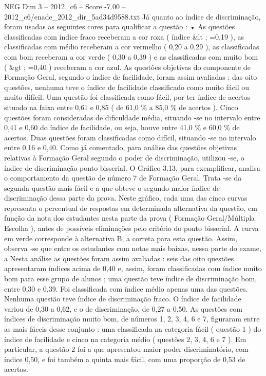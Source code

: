 \begin{textsample}{NEG Dim 3 – 2012\_c6 – Score -7.00 – 2012\_c6/enade\_2012\_dir\_5ad34d9588.txt}
Já quanto ao índice de discriminação, foram usadas as seguintes cores para qualificar a questão : • As questões classificadas com índice fraco receberam a cor roxa ( índice \&lt ; =0,19 ), as classificadas com médio receberam a cor vermelho ( 0,20 a 0,29 ), as classificadas com bom receberam a cor verde ( 0,30 a 0,39 ) e as classificadas com muito bom ( \&gt ; =0,40 ) receberam a cor azul.
As questões objetivas do componente de Formação Geral, segundo o índice de facilidade, foram assim avaliadas : das oito questões, nenhuma teve o índice de facilidade classificado como muito fácil ou muito difícil.
Uma questão foi classificada como fácil, por ter índice de acertos situado na faixa entre 0,61 e 0,85 ( de 61,0 \% a 85,0 \% de acertos ).
Cinco questões foram consideradas de dificuldade média, situando -se no intervalo entre 0,41 e 0,60 do índice de facilidade, ou seja, houve entre 41,0 \% e 60,0 \% de acertos.
Duas questões foram classificadas como difícil, situando -se no intervalo entre 0,16 e 0,40.
Como já comentado, para análise das questões objetivas relativas à Formação Geral segundo o poder de discriminação, utilizou -se, o índice de discriminação ponto bisserial.
O Gráfico 3.13, para exemplificar, analisa o comportamento da questão de número 7 de Formação Geral.
Trata -se da segunda questão mais fácil e a que obteve o segundo maior índice de discriminação dessa parte da prova.
Neste gráfico, cada uma das cinco curvas representa o percentual de respostas em determinada alternativa da questão, em função da nota dos estudantes nesta parte da prova ( Formação Geral/Múltipla Escolha ), antes de possíveis eliminações pelo critério do ponto bisserial.
A curva em verde corresponde à alternativa B, a correta para esta questão.
Assim, observa -se que entre os estudantes com notas mais baixas, nessa parte do exame, a Nesta análise as questões foram assim avaliadas : seis das oito questões apresentaram índices acima de 0,40 e, assim, foram classificadas com índice muito bom para esse grupo de alunos ; uma questão teve índice de discriminação bom, entre 0,30 e 0,39.
Foi classificada com índice médio apenas uma das questões.
Nenhuma questão teve índice de discriminação fraco.
O índice de facilidade variou de 0,30 a 0,62, e o de discriminação, de 0,27 a 0,50.
As questões com índices de discriminação muito bom, de números 1, 2, 3, 4, 6 e 7, figuraram entre as mais fáceis desse conjunto : uma classificada na categoria fácil ( questão 1 ) do índice de facilidade e cinco na categoria médio ( questões 2, 3, 4, 6 e 7 ).
Em particular, a questão 2 foi a que apresentou maior poder discriminatório, com índice 0,50, e foi também a quinta mais fácil, com uma proporção de 0,53 de acertos.

\end{textsample}
